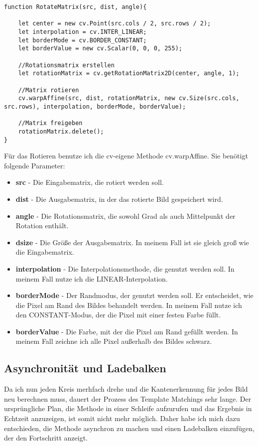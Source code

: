 \begin{lstlisting}[style=JavaScript]
function RotateMatrix(src, dist, angle){

    let center = new cv.Point(src.cols / 2, src.rows / 2);
    let interpolation = cv.INTER_LINEAR;
    let borderMode = cv.BORDER_CONSTANT;
    let borderValue = new cv.Scalar(0, 0, 0, 255);

    //Rotationsmatrix erstellen
    let rotationMatrix = cv.getRotationMatrix2D(center, angle, 1);

    //Matrix rotieren
    cv.warpAffine(src, dist, rotationMatrix, new cv.Size(src.cols, src.rows), interpolation, borderMode, borderValue);

    //Matrix freigeben
    rotationMatrix.delete();
}
\end{lstlisting}

Für das Rotieren benutze ich die cv-eigene Methode cv.warpAffine. Sie benötigt folgende Parameter:

\begin{itemize}
    \item \textbf{src} - Die Eingabematrix, die rotiert werden soll.
    \item \textbf{dist} - Die Ausgabematrix, in der das rotierte Bild gespeichert wird.
    \item \textbf{angle} - Die Rotationsmatrix, die sowohl Grad als auch Mittelpunkt der Rotation enthält.
    \item \textbf{dsize} - Die Größe der Ausgabematrix. In meinem Fall ist sie gleich groß wie die Eingabematrix.
    \item \textbf{interpolation} - Die Interpolationsmethode, die genutzt werden soll. In meinem Fall nutze ich die LINEAR-Interpolation.
    \item \textbf{borderMode} - Der Randmodus, der genutzt werden soll. Er entscheidet, wie die Pixel am Rand des Bildes behandelt werden. In meinem Fall nutze ich den CONSTANT-Modus, der die Pixel mit einer festen Farbe füllt.
    \item \textbf{borderValue} - Die Farbe, mit der die Pixel am Rand gefüllt werden. In meinem Fall zeichne ich alle Pixel außerhalb des Bildes schwarz.
\end{itemize}

\subsection{Asynchronität und Ladebalken}
Da ich nun jeden Kreis merhfach drehe und die Kantenerkennung für jedes Bild neu berechnen muss, dauert der Prozess des Template Matchings sehr lange. Der ursprüngliche Plan, die Methode in einer Schleife aufzurufen und das Ergebnis in Echtzeit anzuzeigen, ist somit nicht mehr möglich. Daher habe ich mich dazu entschieden, die Methode asynchron zu machen und einen Ladebalken einzufügen, der den Fortschritt anzeigt.

